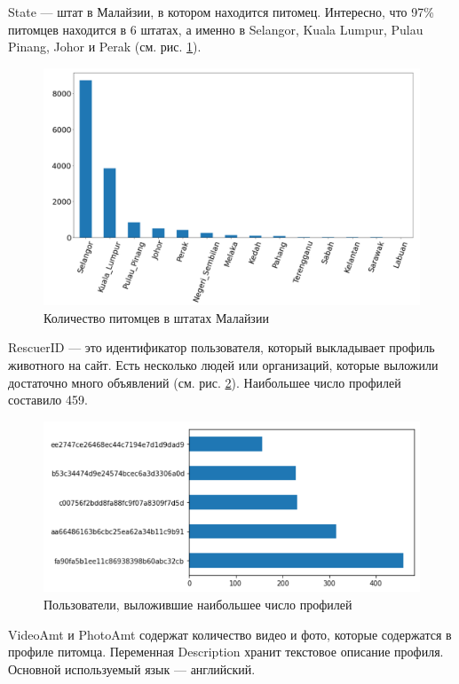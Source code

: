 \documentclass[14pt]{mmcs_article}
\begin{document}
State --- штат в Малайзии, в котором находится питомец. Интересно, что 97\% питомцев находится в 6 штатах, а именно в Selangor, Kuala Lumpur, Pulau Pinang, Johor и Perak (см. рис. \ref{analyse:state}).

\begin{figure}[H]
	\centering
	\includegraphics[scale=0.5]{state.png}
	\caption{Количество питомцев в штатах Малайзии}\label{analyse:state}
\end{figure}

RescuerID --- это идентификатор пользователя, который выкладывает профиль животного на сайт. Есть несколько людей или организаций, которые выложили достаточно много объявлений (см. рис. \ref{analyse:rescuer}). Наибольшее число профилей составило 459.

\begin{figure}[H]
	\centering
	\includegraphics[scale=0.8]{rescuer.png}
	\caption{Пользователи, выложившие наибольшее число профилей}\label{analyse:rescuer}
\end{figure}

VideoAmt и PhotoAmt содержат количество видео и фото, которые содержатся в профиле питомца.
Переменная Description хранит текстовое описание профиля. Основной используемый язык --- английский.
\end{document}
